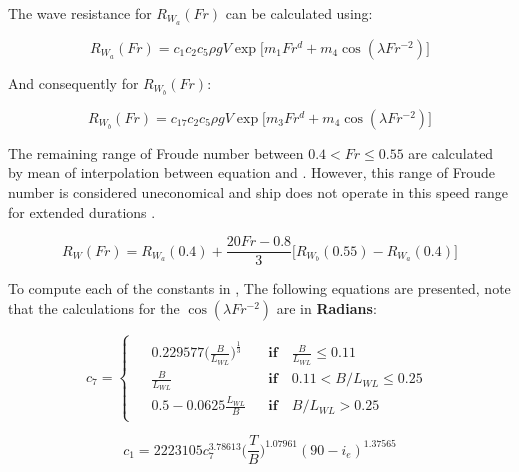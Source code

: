 The wave resistance for $R_{W_a}(Fr)$ can be calculated using:

\begin{equation}\label{eqn:R_w_low}
    R_{W_a}(Fr) = c_1 c_2 c_5 \rho g V  \exp \biggl[ m_1 Fr^d + m_4 \cos(\lambda Fr ^{-2}) \biggr]
\end{equation}

And consequently for $R_{W_b}(Fr)$:

\begin{equation}\label{eqn:R_w_high}
    R_{W_b}(Fr) = c_{17} c_2 c_5 \rho g V  \exp \biggl[ m_3 Fr^d + m_4 \cos(\lambda Fr ^{-2}) \biggr]
\end{equation}

The remaining range of Froude number between $0.4 < Fr \leqslant 0.55 $ are calculated by mean of interpolation between equation  and . However, this range of Froude number is considered uneconomical and ship does not operate in this speed range for extended durations .

\begin{equation}\label{eqn_R_w_mid}
    R_W(Fr) = R_{W_a}(0.4) + \frac{20Fr-0.8}{3} \biggl[ R_{W_b}(0.55) - R_{W_a}(0.4)\biggr]
\end{equation}

To compute each of the constants in , The following equations are presented, note that the calculations for the \textbf{$\cos (\lambda Fr^{-2})$} are in \textbf{Radians}:

\begin{equation}\label{c_17}
    c_7 = \begin{cases}
        \begin{aligned}
        &0.229577\biggl(\frac{B}{L_{WL}} \biggr)^\frac{1}{3}  &&\textbf{if} \quad \frac{B}{L_{WL}} \leqslant 0.11 \\
        &\frac{B}{L_{WL}}  &&\textbf{if}  \quad 0.11 < B/L_{WL} \leqslant 0.25\\
        &0.5 - 0.0625\frac{L_{WL}}{B}  &&\textbf{if}  \quad B/L_{WL}>0.25 
        \end{aligned} 
    \end{cases}
\end{equation}

\begin{equation}\label{c_1}
    c_1 = 2223105c_7^{3.78613}\biggl( \frac{T}{B}\biggr)^{1.07961}(90-i_e)^{1.37565}
\end{equation}

